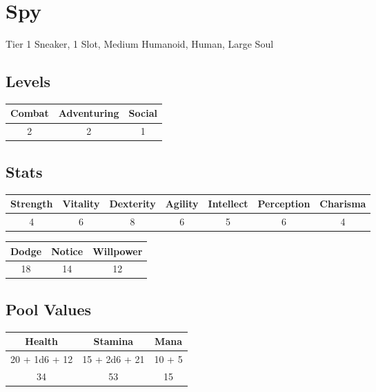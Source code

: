 \section{Spy}
Tier 1 Sneaker, 1 Slot, Medium Humanoid, Human, Large Soul\\

\subsection{Levels}
\begin{minipage}[H]{1\textwidth}
	\centering
	\begin{tabular}[c]{|c | c | c|}
		\hline
		Combat & Adventuring & Social\\
		\hline
		2 & 2 & 1\\
		\hline
	\end{tabular}
\end{minipage}

\subsection{Stats}
\begin{minipage}[H]{1\textwidth}
	\centering
	\begin{tabular}[c]{|c | c | c | c | c | c | c|}
		\hline
		Strength & Vitality & Dexterity & Agility & Intellect & Perception & Charisma\\
		\hline
		4 & 6 & 8 & 6 & 5 & 6 & 4\\
		\hline
	\end{tabular}
\end{minipage}
\bigbreak

\begin{minipage}[H]{1\textwidth}
	\centering
	\begin{tabular}[c]{|c | c | c|}
		\hline
		Dodge & Notice & Willpower\\
		\hline
		18 & 14 & 12\\
		\hline
	\end{tabular}
\end{minipage}

\subsection{Pool Values}
\bigbreak
\begin{minipage}[H]{1\textwidth}
	\centering
	\begin{tabular}[c]{|c | c | c|}
		\hline
		Health & Stamina & Mana\\
		\hline
		20 + 1d6 + 12 & 15 + 2d6 + 21 & 10 + 5 \\
		34 & 53 & 15\\
		\hline
	\end{tabular}
\end{minipage}
\noindent

